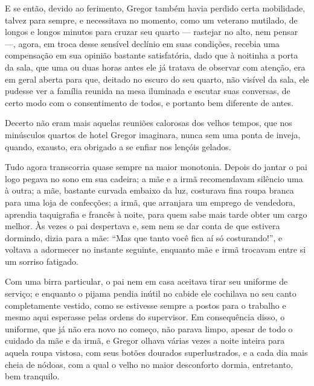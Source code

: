 E se então, devido ao ferimento, Gregor também havia perdido certa
mobilidade, talvez para sempre, e necessitava no momento, como um veterano
mutilado, de longos e longos minutos para cruzar seu quarto --- rastejar no
alto, nem pensar ---, agora, em troca desse sensível declínio em suas
condições, recebia uma compensação em sua opinião bastante satisfatória,
dado que à noitinha a porta da sala, que uma ou duas horas antes ele já
tratava de observar com atenção, era em geral aberta para que, deitado no
escuro do seu quarto, não visível da sala, ele pudesse ver a família
reunida na mesa iluminada e escutar suas conversas, de certo modo com o
consentimento de todos, e portanto bem diferente de antes.

Decerto não eram mais aquelas reuniões calorosas dos velhos tempos, que
nos minúsculos quartos de hotel Gregor imaginara, nunca sem uma ponta de
inveja, quando, exausto, era obrigado a se enfiar nos lençóis gelados.

Tudo agora transcorria quase sempre na maior monotonia. Depois do jantar o
pai logo pegava no sono em sua cadeira; a mãe e a irmã recomendavam
silêncio uma à outra; a mãe, bastante curvada embaixo da luz, costurava
fina roupa branca para uma loja de confecções; a irmã, que arranjara um
emprego de vendedora, aprendia taquigrafia e francês à noite, para quem
sabe mais tarde obter um cargo melhor. Às vezes o pai despertava e, sem
nem se dar conta de que estivera dormindo, dizia para a mãe: “Mas que
tanto você fica aí só costurando!”, e voltava a adormecer no instante
seguinte, enquanto mãe e irmã trocavam entre si um sorriso fatigado.

Com uma birra particular, o pai nem em casa aceitava tirar seu uniforme de
serviço; e enquanto o pijama pendia inútil no cabide ele cochilava no seu
canto completamente vestido, como se estivesse sempre a postos para o
trabalho e mesmo aqui esperasse pelas ordens do supervisor. Em
consequência disso, o uniforme, que já não era novo no começo, não parava
limpo, apesar de todo o cuidado da mãe e da irmã, e Gregor olhava várias
vezes a noite inteira para aquela roupa vistosa, com seus botões dourados
superlustrados, e a cada dia mais cheia de nódoas, com a qual o velho no
maior desconforto dormia, entretanto, bem tranquilo.

